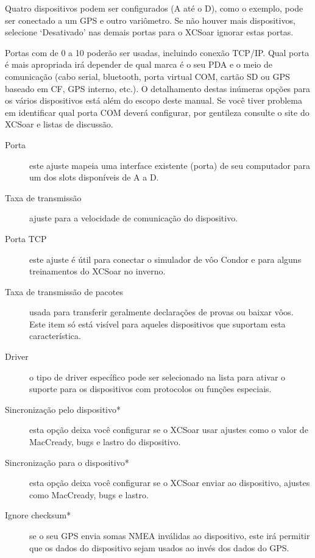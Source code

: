 Quatro dispositivos podem ser configurados (A até o D), como o exemplo, pode ser conectado a um GPS e outro variômetro.  Se não houver mais dispositivos, selecione ‘Desativado’ nas demais portas para o XCSoar ignorar estas portas.


Portas com de 0 a 10 poderão ser usadas, incluindo conexão TCP/IP.   Qual porta é mais apropriada irá depender de qual marca é o seu PDA e o meio de comunicação (cabo serial, bluetooth, porta virtual COM, cartão SD ou GPS baseado em CF, GPS interno, etc.).  O detalhamento destas inúmeras opções para os vários dispositivos está além do escopo deste manual.  Se você tiver problema em identificar qual porta COM deverá configurar, por gentileza consulte o site do XCSoar e listas de discussão.  

\begin{description}
\item[Porta] este ajuste mapeia uma interface existente (porta) de seu computador para um dos slots disponíveis de A a D.
\item[Taxa de transmissão]  ajuste para a velocidade de comunicação do dispositivo.
\item[Porta TCP]  este ajuste é útil para conectar o simulador de vôo Condor e para alguns treinamentos do XCSoar no inverno.
\item[Taxa de transmissão de pacotes]  usada para transferir geralmente declarações de provas ou baixar vôos.  Este item só está visível para aqueles dispositivos que suportam esta característica.
\item[Driver] o tipo de driver específico pode ser selecionado na lista para ativar o suporte para os dispositivos com protocolos ou funções especiais.
\item[Sincronização pelo dispositivo*]  esta opção deixa você configurar se o XCSoar usar ajustes como o valor de MacCready, bugs e lastro do dispositivo.
\item[Sincronização para o dispositivo*]  esta opção deixa você configurar se o XCSoar enviar ao dispositivo, ajustes como MacCready, bugs e lastro.
\item[Ignore checksum*] se o seu GPS envia somas NMEA inválidas ao dispositivo, este irá permitir que os dados do dispositivo sejam usados ao invés dos dados do GPS. 
\end{description}

